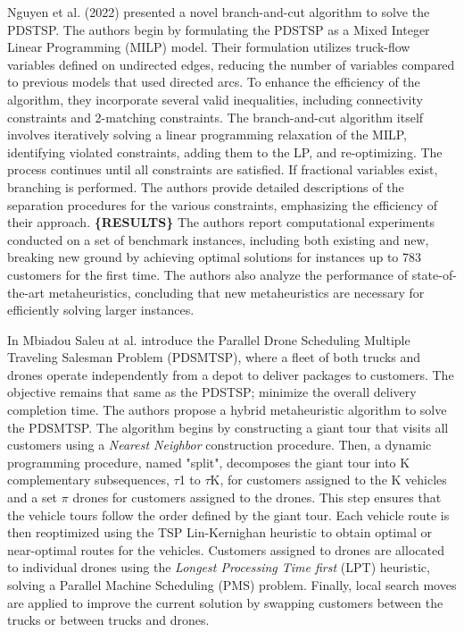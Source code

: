 \documentclass{article}
\begin{document}
	 \par
	 Nguyen et al. (2022) \cite{Nguyen2023} presented a novel branch-and-cut algorithm to solve the PDSTSP. The authors begin by formulating the PDSTSP as a Mixed Integer Linear Programming (MILP) model. Their formulation utilizes truck-flow variables defined on undirected edges, reducing the number of variables compared to previous models that used directed arcs. To enhance the efficiency of the algorithm, they incorporate several valid inequalities, including connectivity constraints and 2-matching constraints.
	 The branch-and-cut algorithm itself involves iteratively solving a linear programming relaxation of the MILP, identifying violated constraints, adding them to the LP, and re-optimizing. The process continues until all constraints are satisfied. If fractional variables exist, branching is performed. The authors provide detailed descriptions of the separation procedures for the various constraints, emphasizing the efficiency of their approach.
	 \textbf{\{RESULTS\}} The authors report computational experiments conducted on a set of benchmark instances, including both existing and new, breaking new ground by achieving optimal solutions for instances up to 783 customers for the first time. The authors also analyze the performance of state-of-the-art metaheuristics, concluding that new metaheuristics are necessary for efficiently solving larger instances.
	\par 
	In \cite{MbiadouSaleu2022} Mbiadou Saleu at al. introduce the Parallel Drone Scheduling Multiple Traveling Salesman Problem (PDSMTSP), where a fleet of both trucks and drones operate independently from a depot to deliver packages to customers. The objective remains that same as the PDSTSP; minimize the overall delivery completion time. The authors propose a hybrid metaheuristic algorithm to solve the PDSMTSP. The algorithm begins by constructing a giant tour that visits all customers using a \textit{Nearest Neighbor} construction procedure. Then, a dynamic programming procedure, named "split", decomposes the giant tour into K complementary subsequences, $\tau$1 to $\tau$K, for customers assigned to the K vehicles and a set $\pi$ drones for customers assigned to the drones. This step ensures that the vehicle tours follow the order defined by the giant tour. Each vehicle route is then reoptimized using the TSP Lin-Kernighan heuristic to obtain optimal or near-optimal routes for the vehicles. Customers assigned to drones are allocated to individual drones using the \textit{Longest Processing Time first} (LPT) heuristic, solving a Parallel Machine Scheduling (PMS) problem. Finally, local search moves are applied to improve the current solution by swapping customers between the trucks or between trucks and drones. 
\end{document}
